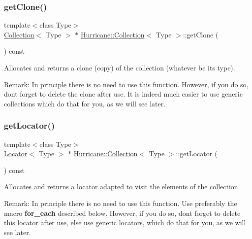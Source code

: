\subsubsection{\texorpdfstring{get\+Clone()}{getClone()}}
{\footnotesize\ttfamily template$<$class Type$>$ \\
\mbox{\hyperlink{classHurricane_1_1Collection}{Collection}}$<$ Type $>$ $\ast$ \mbox{\hyperlink{classHurricane_1_1Collection}{Hurricane\+::\+Collection}}$<$ Type $>$\+::get\+Clone (\begin{DoxyParamCaption}{ }\end{DoxyParamCaption}) const\hspace{0.3cm}{\ttfamily [pure virtual]}}

Allocates and returns a clone (copy) of the collection (whatever be its type).

\begin{DoxyParagraph}{Remark\+: In principle there is no need to use this function. However, }
if you do so, don\textquotesingle{}t forget to delete the clone after use. It is indeed much easier to use generic collections which do that for you, as we will see later. 
\end{DoxyParagraph}
\mbox{\label{classHurricane_1_1Collection_a48fd1a0a2b6d2530a87e22ba65aa3152}} 
\subsubsection{\texorpdfstring{get\+Locator()}{getLocator()}}
{\footnotesize\ttfamily template$<$class Type$>$ \\
\mbox{\hyperlink{classHurricane_1_1Locator}{Locator}}$<$ Type $>$ $\ast$ \mbox{\hyperlink{classHurricane_1_1Collection}{Hurricane\+::\+Collection}}$<$ Type $>$\+::get\+Locator (\begin{DoxyParamCaption}{ }\end{DoxyParamCaption}) const\hspace{0.3cm}{\ttfamily [pure virtual]}}

Allocates and returns a locator adapted to visit the elements of the collection.

\begin{DoxyParagraph}{Remark\+: In principle there is no need to use this function. Use }
preferably the macro {\bfseries for\+\_\+each} described below. However, if you do so, don\textquotesingle{}t forget to delete this locator after use, else use generic locators, which do that for you, as we will see later. 
\end{DoxyParagraph}


